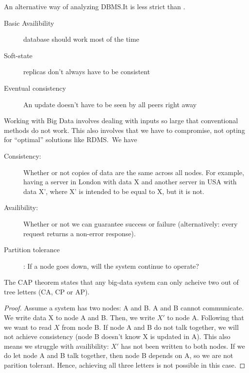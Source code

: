\begin{definition}[BASE]\label{def:base}
    An alternative way of analyzing DBMS.\@ It is less strict than .
    \begin{description}
        \item[Basic Availibility] database should work most of the time
        \item[Soft-state] replicas don't always have to be consistent
        \item[Eventual consistency] An update doesn't have to be seen by all peers right away
    \end{description}
\end{definition}

\begin{definition}\label{def:captheorem}
    Working with Big Data involves dealing with inputs so large that conventional methods do not work.
    This also involves that we have to compromise, not opting for ``optimal'' solutions like RDMS.\
    We have 
    \begin{description}
        \item[Consistency:] Whether or not copies of data are the same across all nodes.
        For example, having a server in London with data X and another server in USA with data X', where X' is intended to be equal to X, but it is not.
        \item[Availibility:] Whether or not we can guarantee success or failure (alternatively: every request returns a non-error response).
        \item[Partition tolerance]:  If a node goes down, will the system continue to operate?
    \end{description}

    The CAP theorem states that any big-data system can only acheive two out of tree letters (CA, CP or AP).
\end{definition}

\begin{proof}
Assume a system has two nodes: A and B. A and B cannot communicate.
We write data X to node A and B. Then, we write $X'$ to node A. Following that we want to read $X$ from node B.
If node A and B do not talk together, we will not achieve consistency (node B doesn't know X is updated in A).
This also means we struggle with availibility: $X'$ has not been written to both nodes.
If we do let node A and B talk together, then node B depends on A, so we are not parition tolerant.
Hence, achieving all three letters is not possible in this case.
\end{proof}

